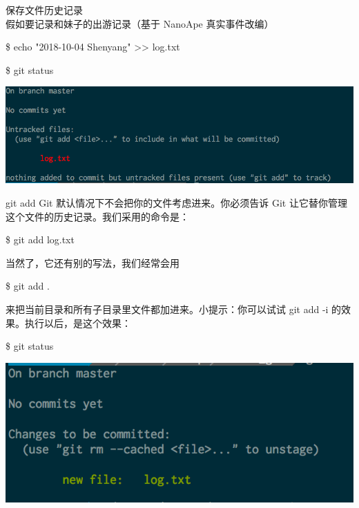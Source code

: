 \documentclass{beamer}
\begin{document}
\begin{frame}[fragile]{保存文件历史记录}
    假如要记录和妹子的出游记录（基于 NanoApe 真实事件改编）

    \$ echo "2018-10-04 Shenyang" >{}> log.txt

    \$ git status
    
    \includegraphics[width=\linewidth]{2018-10-25-09-30-24.png}
\end{frame}

\begin{frame}{git add}
    Git 默认情况下不会把你的文件考虑进来。你必须告诉 Git 让它替你管理这个文件的历史记录。我们采用的命令是：

    \$ git add log.txt

    当然了，它还有别的写法，我们经常会用

    \$ git add .

    来把当前目录和所有子目录里文件都加进来。小提示：你可以试试 git add -i 的效果。执行以后，是这个效果：
    
    \$ git status

    \includegraphics[width=\linewidth]{2018-10-25-09-33-45.png}

\end{frame}
\end{document}
